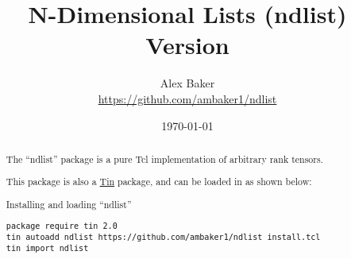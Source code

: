 \documentclass{article}
\title{\Huge{N-Dimensional Lists (ndlist)}\\\large Version \version}
\author{Alex Baker\\\small\url{https://github.com/ambaker1/ndlist}}
\date{\small\today}
\begin{document}
\maketitle
\begin{abstract}
\begin{center}
The ``ndlist'' package is a pure Tcl implementation of arbitrary rank tensors.

This package is also a \textcolor{blue}{\href{https://github.com/ambaker1/Tin}{Tin}} package, and can be loaded in as shown below:
\end{center}
\begin{example}{Installing and loading ``ndlist''}
\begin{lstlisting}
package require tin 2.0
tin autoadd ndlist https://github.com/ambaker1/ndlist install.tcl
tin import ndlist
\end{lstlisting}
\end{example}
\end{abstract}
\clearpage








\small{\printindex}
\end{document}
